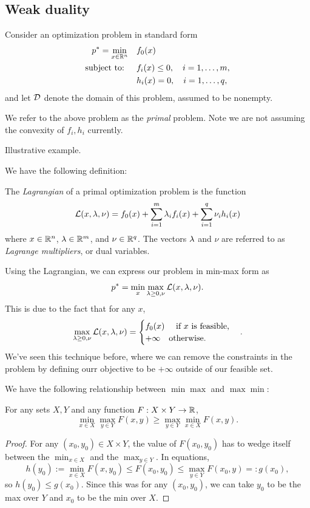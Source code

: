 \documentclass[11 pt]{scrartcl}
\begin{document}
\subsection{Weak duality}
Consider an optimization problem in standard form 
\begin{align*}
    p^* = \min_{x\in\mathbb R^n} \quad & f_0(x) \\ 
    \text{subject to: } \quad & f_i(x) \leq 0, \quad i = 1,\dots, m, \\ 
                              & h_i(x) = 0, \quad i = 1,\dots, q,
\end{align*}
and let $\mathcal D$ denote the domain of this problem, assumed to be nonempty. 

We refer to the above problem as the \emph{primal} problem. 
Note we are not assuming the convexity of $f_i, h_i$ currently. 

\begin{example}
    Illustrative example.
\end{example}

We have the following definition: 
\begin{definition}[Lagrangian]
    The \emph{Lagrangian} of a primal optimization problem is the function 
    \[ \mathcal L(x,\lambda,\nu) = f_0(x) + \sum_{i=1}^m \lambda_i f_i(x) + \sum_{i=1}^q \nu_i h_i(x)\] 
    where $x\in \mathbb R^n$, $\lambda \in \mathbb R^m$, and $\nu\in \mathbb R^q$. 
    The vectors $\lambda$ and $\nu$ are referred to as \emph{Lagrange multipliers}, or dual variables.
\end{definition}

Using the Lagrangian, we can express our problem in min-max form as 
\[ p^* = \min_x \max_{\lambda\geq 0, \nu} \mathcal L(x,\lambda,\nu).\] 
This is due to the fact that for any $x$, 
\[ \max_{\lambda\geq 0, \nu} \mathcal L(x,\lambda,\nu) = \begin{cases} f_0(x) \quad \text{ if } x\text{ is feasible,} \\ +\infty \quad \text{otherwise}.\end{cases}.\] 
We've seen this technique before, where we can remove the constraints in the problem by defining ourr objective to be $+\infty$ outside of our feasible set. 

We have the following relationship between $\min\max$ and $\max\min$: 
\begin{theorem}
For any sets $X,Y$ and any function $F: X\times Y\to \mathbb R$, 
\[ \min_{x\in X} \max_{y\in Y} F(x,y) \geq \max_{y\in Y} \min_{x\in X} F(x,y).\] 
\end{theorem}
\begin{proof}
    For any $(x_0, y_0) \in X\times Y$, the value of $F(x_0, y_0)$ has to wedge itself between the $\min_{x\in X}$ and the $\max_{y\in Y}$. 
    In equations, 
    \[ h(y_0) := \min_{x\in X} F(x,y_0) \leq F(x_0, y_0) \leq \max_{y\in Y} F(x_0, y) =: g(x_0),\]
    so $h(y_0) \leq g(x_0)$.
    Since this was for any $(x_0, y_0)$, we can take $y_0$ to be the max over $Y$ and $x_0$ to be the min over $X$.
\end{proof}
\end{document}
